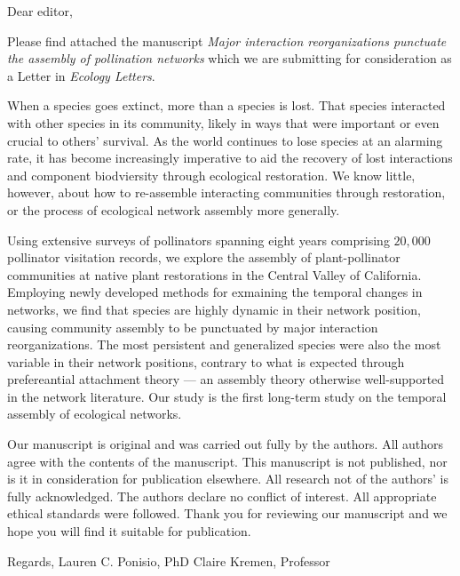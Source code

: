 \documentclass[12pt]{letter}
\begin{document}
\begin{letter}{}

  \opening{Dear editor,}

  Please find attached the manuscript \textit{Major interaction
    reorganizations punctuate the assembly of pollination networks}
  which we are submitting for consideration as a Letter in
  \textit{Ecology Letters}.  

  When a species goes extinct, more than a species is lost. That
  species interacted with other species in its community, likely in
  ways that were important or even crucial to others' survival. As the
  world continues to lose species at an alarming rate, it has become
  increasingly imperative to aid the recovery of lost interactions and
  component biodviersity through ecological restoration. We know
  little, however, about how to re-assemble interacting communities
  through restoration, or the process of ecological network assembly
  more generally.

  Using extensive surveys of pollinators spanning eight years
  comprising \texttildelow $20,000$ pollinator visitation records, we
  explore the assembly of plant-pollinator communities at native plant
  restorations in the Central Valley of California. Employing newly
  developed methods for exmaining the temporal changes in networks, we
  find that species are highly dynamic in their network position,
  causing community assembly to be punctuated by major interaction
  reorganizations. The most persistent and generalized species were
  also the most variable in their network positions, contrary to what
  is expected through prefereantial attachment theory --- an assembly
  theory otherwise well-supported in the network literature. Our study
  is the first long-term study on the temporal assembly of ecological
  networks.

  Our manuscript is original and was carried out fully by the authors.
  All authors agree with the contents of the manuscript.  This
  manuscript is not published, nor is it in consideration for
  publication elsewhere.  All research not of the authors' is fully
  acknowledged.  The authors declare no conflict of interest. All
  appropriate ethical standards were followed.  Thank you for
  reviewing our manuscript and we hope you will find it suitable for
  publication.
  
  Regards,
  Lauren C. Ponisio, PhD
  Claire Kremen, Professor

\end{letter}
\end{document}
